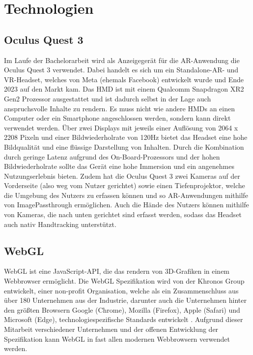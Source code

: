 \chapter{Technologien}

\section{Oculus Quest 3}

Im Laufe der Bachelorarbeit wird als Anzeigegerät für die AR-Anwendung die Oculus Quest 3 verwendet.
Dabei handelt es sich um ein Standalone-AR- und VR-Headset, welches von Meta (ehemals Facebook) entwickelt wurde und Ende 2023 auf den Markt kam.
Das HMD ist mit einem Qualcomm Snapdragon XR2 Gen2 Prozessor ausgestattet und ist dadurch selbst in der Lage auch anspruchsvolle Inhalte zu rendern.
Es muss nicht wie andere HMDs an einen Computer oder ein Smartphone angeschlossen werden, sondern kann direkt verwendet werden.
Über zwei Displays mit jeweils einer Auflösung von 2064 x 2208 Pixeln und einer Bildwiederholrate von 120Hz bietet das Headset eine hohe Bildqualität und eine flüssige Darstellung von Inhalten.
Durch die Kombination durch geringe Latenz aufgrund des On-Board-Prozessors und der hohen Bildwiederholrate sollte das Gerät eine hohe Immersion und ein angenehmes Nutzungserlebnis bieten.
Zudem hat die Oculus Quest 3 zwei Kameras auf der Vorderseite (also weg vom Nutzer gerichtet) sowie einen Tiefenprojektor, welche die Umgebung des Nutzers zu erfassen können und so AR-Anwendungen mithilfe von ImagePassthrough ermöglichen.
Auch die Hände des Nutzers können mithilfe von Kameras, die nach unten gerichtet sind erfasst werden, sodass das Headset auch nativ Handtracking unterstützt.
\autocite[]{meta-quest-3}


\section{WebGL}

WebGL ist eine JavaScript-API, die das rendern von 3D-Grafiken in einem Webbrowser ermöglicht.
Die WebGL Spezifikation wird von der Khronos Group entwickelt, einer non-profit Organisation, welche als ein Zusammenschluss aus über 180 Unternehmen aus der Industrie, darunter auch die Unternehmen hinter den größten Browsern Google (Chrome), Mozilla (Firefox), Apple (Safari) und Microsoft (Edge), technologiespezifische Standards entwickelt \autocite[]{khronos-webgl, khronos-about}.
Aufgrund dieser Mitarbeit verschiedener Unternehmen und der offenen Entwicklung der Spezifikation kann WebGL in fast allen modernen Webbrowsern verwendet werden.

